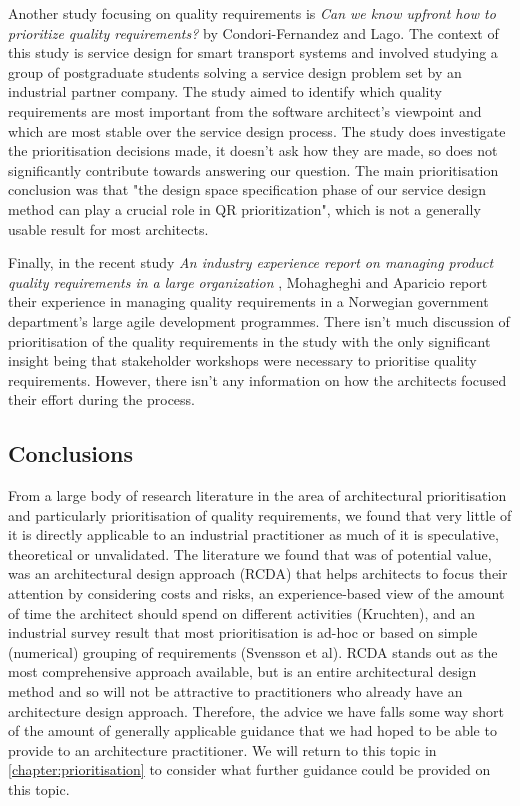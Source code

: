 Another study focusing on quality requirements is \emph{Can we know upfront how to prioritize quality requirements?} \cite{fernandez2015-qrprioritisation} by Condori-Fernandez and Lago.  The context of this study is service design for smart transport systems and involved studying a group of postgraduate students solving a service design problem set by an industrial partner company.  The study aimed to identify which quality requirements are most important from the software architect's viewpoint and which are most stable over the service design process.  The study does investigate the prioritisation decisions made, it doesn't ask how they are made, so does not significantly contribute towards answering our question.  The main prioritisation conclusion was that "the design space specification phase of our service design method can play a crucial role in QR prioritization", which is not a generally usable result for most architects.

Finally, in the recent study \emph{An industry experience report on managing product quality requirements in a large organization} \cite{mohagheghi2017-managingqr}, Mohagheghi and Aparicio report their experience in managing quality requirements in a Norwegian government department's large agile development programmes.  There isn't much discussion of prioritisation of the quality requirements in the study with the only significant insight being that stakeholder workshops were necessary to prioritise quality requirements.  However, there isn't any information on how the architects focused their effort during the process.

\subsection{Conclusions}

From a large body of research literature in the area of architectural prioritisation and particularly prioritisation of quality requirements, we found that very little of it is directly applicable to an industrial practitioner as much of it is speculative, theoretical or unvalidated.  The literature we found that was of potential value, was an architectural design approach (RCDA) that helps architects to focus their attention by considering costs and risks, an experience-based view of the amount of time the architect should spend on different activities (Kruchten), and an industrial survey result that most prioritisation is ad-hoc or based on simple (numerical) grouping of requirements (Svensson et al).  RCDA stands out as the most comprehensive approach available, but is an entire architectural design method and so will not be attractive to practitioners who already have an architecture design approach.  Therefore, the advice we have falls some way short of the amount of generally applicable guidance that we had hoped to be able to provide to an architecture practitioner.  We will return to this topic in \cref{chapter:prioritisation} to consider what further guidance could be provided on this topic.


